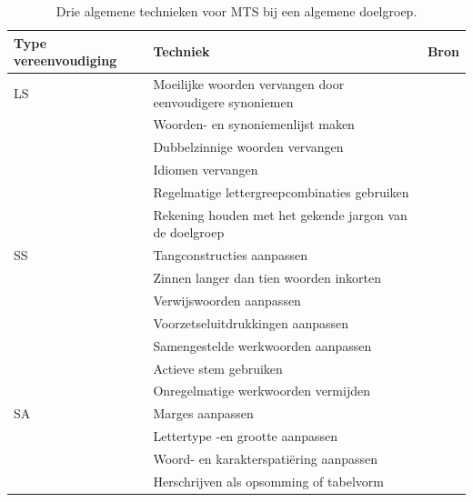 \begin{center}
		\begin{table}[H]
			\begin{tabular}{ | m{2.5cm} | m{8cm} | m{4.5cm} | } 
			\hline
			\textbf{Type vereenvoudiging} & \textbf{Techniek} & \textbf{Bron} \\ \hline
			
			LS & Moeilijke woorden vervangen door eenvoudigere synoniemen & \autocite{Crossley2012, Rello2013c, Siddharthan2014} \\ 
				& Woorden- en synoniemenlijst maken & \autocite{Siddharthan2006, Bosmans2022b} \\
				& Dubbelzinnige woorden vervangen & \\
				& Idiomen vervangen & \autocite{Siddharthan2006} \\ 
				& Regelmatige lettergreepcombinaties gebruiken & \autocite{Gala2016} \\
				& Rekening houden met het gekende jargon van de doelgroep & \autocite{JavoureyDrevet2022} \\
			\hline
			SS & Tangconstructies aanpassen & \autocite{Bosmans2022c} \\
			& Zinnen langer dan tien woorden inkorten & \autocite{Siddharthan2014} \\
			& Verwijswoorden aanpassen & \autocite{Bosmans2022a} \\
			& Voorzetseluitdrukkingen aanpassen & \autocite{Rello2013d} \\
			& Samengestelde werkwoorden aanpassen & \autocite{Bosmans2022b} \\
			& Actieve stem gebruiken & \autocite{Ruelas2020} \\
			& Onregelmatige werkwoorden vermijden & \autocite{Rello2013d, Gala2016} \\
			\hline
			SA & Marges aanpassen & \autocite{Rello2013d} \\
			& Lettertype -en grootte aanpassen & \autocite{Rello2012a} \\
			& Woord- en karakterspatiëring aanpassen & \autocite{Rello2012a} \\
			& Herschrijven als opsomming of tabelvorm & \autocite{Rello2015} \\
			\hline
		\end{tabular}
		\caption{Drie algemene technieken voor MTS bij een algemene doelgroep.}
		\label{table:manual-simplification}
	\end{table}
\end{center}

